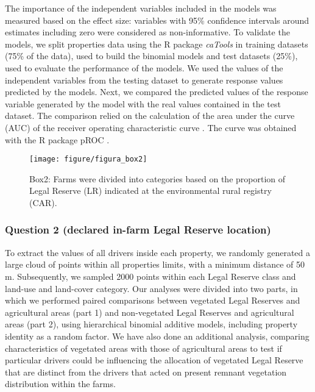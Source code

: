 \documentclass[
	12pt,				%
	oneside,			%
	a4paper,			%
	chapter=TITLE,		%
	section=TITLE,		%
	brazil,			%
	english				%
	]{abntex2}
\begin{document}
The importance of the independent variables included in the models was measured based on the effect size: variables with 95\% confidence intervals around estimates including zero were considered as non-informative. To validate the models, we split properties data using the R package \emph{caTools} \autocite{jarek_catools_2019} in training datasets (75\% of the data), used to build the binomial models and test datasets (25\%), used to evaluate the performance of the models. We used the values of the independent variables from the testing dataset to generate response values predicted by the models. Next, we compared the predicted values of the response variable generated by the model with the real values contained in the test dataset. The comparison relied on the calculation of the area under the curve (AUC) of the receiver operating characteristic curve \autocite{robin_proc_2011}. The curve was obtained with the R package pROC \autocite{robin_proc_2011}.
\begin{figure}[H]

{\centering \texttt{[image: figure/figura\_box2]} 

}

\caption{Box2: Farms were divided into categories  based on the proportion of Legal Reserve (LR) indicated at the  environmental  rural registry (CAR). }\label{fig:unnamed-chunk-3}
\end{figure}
\hypertarget{question-2-declared-in-farm-legal-reserve-location}{%
\subsubsection{Question 2 (declared in-farm Legal Reserve location)}\label{question-2-declared-in-farm-legal-reserve-location}}

To extract the values of all drivers inside each property, we randomly generated a large cloud of points within all properties limits, with a minimum distance of 50 m. Subsequently, we sampled 2000 points within each Legal Reserve class and land-use and land-cover category. Our analyses were divided into two parts, in which we performed paired comparisons between vegetated Legal Reserves and agricultural areas (part 1) and non-vegetated Legal Reserves and agricultural areas (part 2), using hierarchical binomial additive models, including property identity as a random factor. We have also done an additional analysis, comparing characteristics of vegetated areas with those of agricultural areas to test if particular drivers could be influencing the allocation of vegetated Legal Reserve that are distinct from the drivers that acted on present remnant vegetation distribution within the farms.
\end{document}
